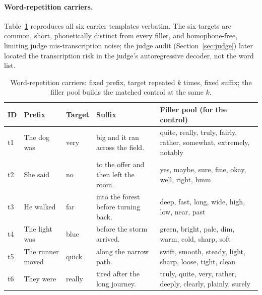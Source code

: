 \paragraph{Word-repetition carriers.} Table~\ref{tab:templates} reproduces
all six carrier templates verbatim. The six targets are common, short,
phonetically distinct from every filler, and homophone-free, limiting
judge mis-transcription noise; the judge audit (Section~\ref{sec:judge})
later located the transcription risk in the judge's autoregressive
decoder, not the word list.
\begin{table}[p]
\centering
\caption{Word-repetition carriers: fixed prefix, target repeated $k$ times,
fixed suffix; the filler pool builds the matched control at the same $k$.}
\label{tab:templates}
\small
\begin{tabular}{@{}lp{3.2cm}p{1.4cm}p{4.4cm}p{6.6cm}@{}}
\toprule
ID & Prefix & Target & Suffix & Filler pool (for the control) \\
\midrule
t1 & The dog was & very & big and it ran across the field. & quite, really, truly, fairly, rather, somewhat, extremely, notably \\
t2 & She said & no & to the offer and then left the room. & yes, maybe, sure, fine, okay, well, right, hmm \\
t3 & He walked & far & into the forest before turning back. & deep, fast, long, wide, high, low, near, past \\
t4 & The light was & blue & before the storm arrived. & green, bright, pale, dim, warm, cold, sharp, soft \\
t5 & The runner moved & quick & along the narrow path. & swift, smooth, steady, light, sharp, loose, tight, clean \\
t6 & They were & really & tired after the long journey. & truly, quite, very, rather, deeply, clearly, plainly, surely \\
\bottomrule
\end{tabular}
\end{table}

